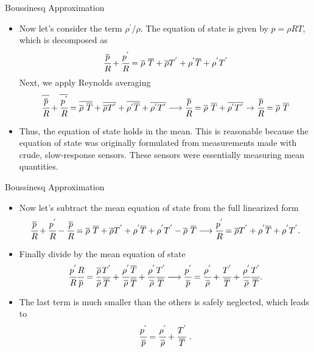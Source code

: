 \begin{frame}{Boussinesq Approximation}

\begin{itemize}
	\item Now let's consider the term $\rho^{'}/\rho$. The equation of state is given by $p=\rho R T$, which is decomposed as
	$$\cfrac{\overline p}{R} +\cfrac{p^{'}}{R} = \overline{\rho}\ \overline{T} + \overline{\rho} T^{'} + \rho^{'}\overline{T} + \rho^{'}T^{'} $$
	Next, we apply Reynolds averaging
$$\overline{\cfrac{\overline p}{R}} + \overline{\cfrac{p^{'}}{R}} = \overline{\overline{\rho}\ \overline{T}} + \overline{\overline{\rho} T^{'}} + \overline{\rho^{'}\overline{T}} + \overline{\rho^{'}T^{'}} \longrightarrow \cfrac{\overline{p}}{R} = \overline{\rho}\ \overline{T}  +  \overline{\rho^{'}T^{'}} \rightarrow \cfrac{\overline{p}}{R} = \overline{\rho}\ \overline{T}$$
	\item Thus, the equation of state holds in the mean. This is reasonable because the equation of state was originally formulated from measurements made with crude, slow-response sensors. These sensors were essentially measuring mean quantities.
\end{itemize}
\end{frame}
\begin{frame}{Boussinesq Approximation}

\begin{itemize}
	\item Now let's subtract the mean equation of state from the full linearized form
	$$
\cfrac{\overline{p}}{R} +\cfrac{p^{'}}{R} - \cfrac{\overline{p}}{R} = \overline{\rho}\ \overline{T} + \overline{\rho} T^{'} + \rho^{'}\overline{T} + \rho^{'}T^{'} - \overline{\rho}\ \overline{T} \longrightarrow \cfrac{p^{'}}{R} = \overline{\rho} T^{'} + \rho^{'}\overline{T} + \rho^{'}T^{'}.$$
	\item Finally divide by the mean equation of state
	$$
\cfrac{p^{'}}{R} \cfrac{R}{\overline{p}} = \cfrac{\overline{\rho}}{\overline{\rho}} \cfrac{T^{'}}{\overline{T}} + \cfrac{\rho^{'}}{\overline{\rho}} \cfrac{\overline{T}}{\overline{T}} + \cfrac{\rho^{'}}{\overline{\rho}} \cfrac{T^{'}}{\overline{T}} \longrightarrow \cfrac{p^{'}}{\overline{p}} = \cfrac{\rho^{'}}{\overline{\rho}} + \cfrac{T^{'}}{\overline{T}} + \cfrac{\rho^{'}}{\overline{\rho}} \cfrac{T^{'}}{\overline{T}}.
$$
\item The last term is much smaller than the others is safely neglected, which leads to 
$$
\cfrac{p^{'}}{\overline{p}} = \cfrac{\rho^{'}}{\overline{\rho}} + \cfrac{T^{'}}{\overline{T}} \mbox{ .}
$$
\end{itemize}
\end{frame}
